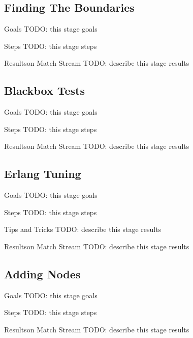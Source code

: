\documentclass[utf8]{beamer}
\begin{document}
\subsection{Finding The Boundaries}
\begin{frame}{Goals}
	TODO: this stage goals
\end{frame}
\begin{frame}{Steps}
	TODO: this stage steps
\end{frame}
\begin{frame}{Results}{on Match Stream}
	TODO: describe this stage results
\end{frame}

\subsection{Blackbox Tests}
\begin{frame}{Goals}
	TODO: this stage goals
\end{frame}
\begin{frame}{Steps}
	TODO: this stage steps
\end{frame}
\begin{frame}{Results}{on Match Stream}
	TODO: describe this stage results
\end{frame}

\subsection{Erlang Tuning}
\begin{frame}{Goals}
	TODO: this stage goals
\end{frame}
\begin{frame}{Steps}
	TODO: this stage steps
\end{frame}
\begin{frame}{Tips and Tricks}
	TODO: describe this stage results
\end{frame}
\begin{frame}{Results}{on Match Stream}
	TODO: describe this stage results
\end{frame}

\subsection{Adding Nodes}
\begin{frame}{Goals}
	TODO: this stage goals
\end{frame}
\begin{frame}{Steps}
	TODO: this stage steps
\end{frame}
\begin{frame}{Results}{on Match Stream}
	TODO: describe this stage results
\end{frame}
\end{document}

